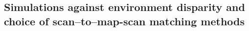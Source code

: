 \begin{figure}\hspace{0.5cm}
  
  \caption{\small}
  \label{fig:}
\end{figure}
\begin{figure}
  
  \caption{\small}
  \label{fig:}
\end{figure}


\subsection{Simulations against environment disparity and choice of scan--to--map-scan matching methods}
\begin{figure}
  
  \caption{\small}
  \label{fig:}
\end{figure}
\begin{figure}
  
  \caption{\small}
  \label{fig:}
\end{figure}

